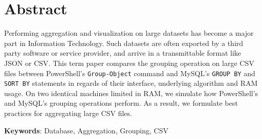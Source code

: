 \section*{Abstract}
Performing aggregation and visualization on large datasets has become a major part in Information Technology.
Such datasets are often exported by a third party software or service provider, and arrive in a transmittable
format like JSON or CSV.
This term paper compares the grouping operation on large CSV files between PowerShell's
\verb+Group-Object+ command and MySQL's \verb+GROUP BY+ and \verb+SORT BY+ statements in regards of
their interface, underlying algorithm and RAM usage. On two identical machines
limited in RAM, we simulate how PowerShell's and MySQL's grouping operations perform. As a result,
we formulate best practices for aggregating large CSV files.

\textbf{Keywords}: Database, Aggregation, Grouping, CSV